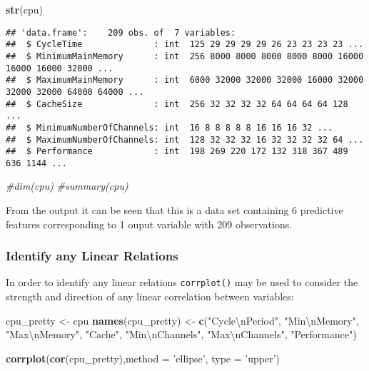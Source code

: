 \documentclass[12pt]{article}
\newenvironment{Shaded}{\begin{snugshade}}{\end{snugshade}}
\newcommand{\CharTok}[1]{\textcolor[rgb]{0.31,0.60,0.02}{#1}}
\newcommand{\CommentTok}[1]{\textcolor[rgb]{0.56,0.35,0.01}{\textit{#1}}}
\newcommand{\DataTypeTok}[1]{\textcolor[rgb]{0.13,0.29,0.53}{#1}}
\newcommand{\KeywordTok}[1]{\textcolor[rgb]{0.13,0.29,0.53}{\textbf{#1}}}
\newcommand{\NormalTok}[1]{#1}
\newcommand{\StringTok}[1]{\textcolor[rgb]{0.31,0.60,0.02}{#1}}
\begin{document}
\begin{Shaded}
\begin{Highlighting}[]
\KeywordTok{str}\NormalTok{(cpu)}
\end{Highlighting}
\end{Shaded}

\begin{verbatim}
## 'data.frame':    209 obs. of  7 variables:
##  $ CycleTime              : int  125 29 29 29 29 26 23 23 23 23 ...
##  $ MinimumMainMemory      : int  256 8000 8000 8000 8000 8000 16000 16000 16000 32000 ...
##  $ MaximumMainMemory      : int  6000 32000 32000 32000 16000 32000 32000 32000 64000 64000 ...
##  $ CacheSize              : int  256 32 32 32 32 64 64 64 64 128 ...
##  $ MinimumNumberOfChannels: int  16 8 8 8 8 8 16 16 16 32 ...
##  $ MaximumNumberOfChannels: int  128 32 32 32 16 32 32 32 32 64 ...
##  $ Performance            : int  198 269 220 172 132 318 367 489 636 1144 ...
\end{verbatim}

\begin{Shaded}
\begin{Highlighting}[]
\CommentTok{#dim(cpu)}
\CommentTok{#summary(cpu)}
\end{Highlighting}
\end{Shaded}

From the output it can be seen that this is a data set containing 6
predictive features corresponding to 1 ouput variable with 209
observations.

\hypertarget{identify-any-linear-relations}{%
\subsubsection{Identify any Linear
Relations}\label{identify-any-linear-relations}}

In order to identify any linear relations \texttt{corrplot()} may be
used to consider the strength and direction of any linear correlation
between variables:

\begin{Shaded}
\begin{Highlighting}[]
\NormalTok{cpu_pretty <-}\StringTok{ }\NormalTok{cpu}
\KeywordTok{names}\NormalTok{(cpu_pretty) <-}\StringTok{ }\KeywordTok{c}\NormalTok{(}\StringTok{"Cycle}\CharTok{\textbackslash{}n}\StringTok{Period"}\NormalTok{, }\StringTok{"Min}\CharTok{\textbackslash{}n}\StringTok{Memory"}\NormalTok{, }\StringTok{"Max}\CharTok{\textbackslash{}n}\StringTok{Memory"}\NormalTok{, }\StringTok{"Cache"}\NormalTok{, }\StringTok{"Min}\CharTok{\textbackslash{}n}\StringTok{Channels"}\NormalTok{, }\StringTok{"Max}\CharTok{\textbackslash{}n}\StringTok{Channels"}\NormalTok{, }\StringTok{"Performance"}\NormalTok{)}

\KeywordTok{corrplot}\NormalTok{(}\KeywordTok{cor}\NormalTok{(cpu_pretty),}\DataTypeTok{method =} \StringTok{'ellipse'}\NormalTok{, }\DataTypeTok{type =} \StringTok{'upper'}\NormalTok{)}
\end{Highlighting}
\end{Shaded}
\end{document}

